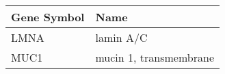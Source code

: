 \begin{tabular}{ll}
\toprule
Gene Symbol &                   Name \\
\midrule
       LMNA &              lamin A/C \\
       MUC1 & mucin 1, transmembrane \\
\bottomrule
\end{tabular}
